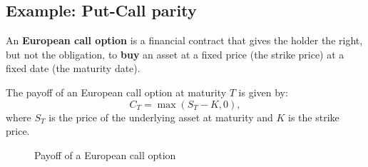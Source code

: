 \subsection{Example: Put-Call parity}

\begin{definition}
    An \textbf{European call option} is a financial contract that gives the holder the right,
    but not the obligation,
    to \textbf{buy} an asset at a fixed price (the strike price) at a fixed date (the maturity date).

    The payoff of an European call option at maturity $T$ is given by:
    \begin{equation}
        C_T = \max(S_T - K, 0),
    \end{equation}
    where $S_T$ is the price of the underlying asset at maturity and $K$ is the strike price.

    \begin{figure}[h] \label{fig:call_payoff}
        \centering
        \caption{Payoff of a European call option}
    \end{figure}
\end{definition}


